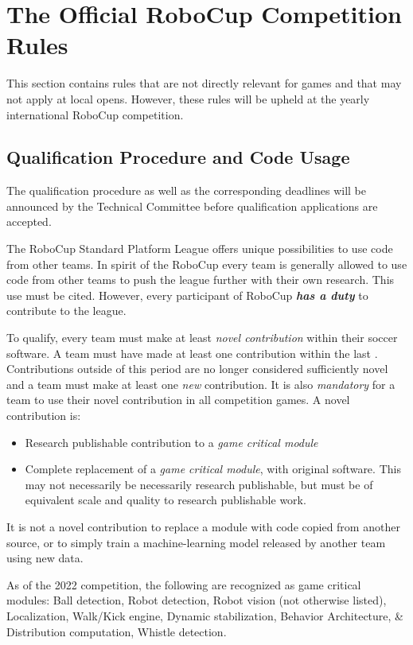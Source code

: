 \section{The Official RoboCup Competition Rules}
\label{sec:comRules}
This section contains rules that are not directly relevant for games and that may not apply at local opens.  However, these rules will be upheld at the yearly international RoboCup competition.

\subsection{Qualification Procedure and Code Usage}
\label{sec:qualification_procedure_codeuse}

The qualification procedure as well as the corresponding deadlines will be announced by the Technical Committee before qualification applications are accepted.

The RoboCup Standard Platform League offers unique possibilities to use code from other teams. In spirit of the RoboCup every team is generally allowed to use code from other teams to push the league further with their own research.
This use must be cited.
However, every participant of RoboCup \textbf{\textit{has a duty}} to contribute to the league.

To qualify, every team must make at least \textit{novel contribution} within their soccer software.
A team must have made at least one contribution within the last \NovelContributionTime.
Contributions outside of this period are no longer considered sufficiently novel and a team must make at least one \textit{new} contribution.
It is also \textit{mandatory} for a team to use their novel contribution in all competition games.
A novel contribution is:
\begin{itemize}
  \item Research publishable contribution to a \textit{game critical module}
  \item Complete replacement of a \textit{game critical module}, with original software. This may not necessarily be necessarily research publishable, but must be of equivalent scale and quality to research publishable work.
\end{itemize}

It is not a novel contribution to replace a module with code copied from another source, or to simply train a machine-learning model released by another team using new data.

As of the 2022 competition, the following are recognized as game critical modules:
Ball detection, Robot detection, Robot vision (not otherwise listed), Localization, Walk/Kick engine, Dynamic stabilization, Behavior Architecture, \& Distribution computation, Whistle detection.

